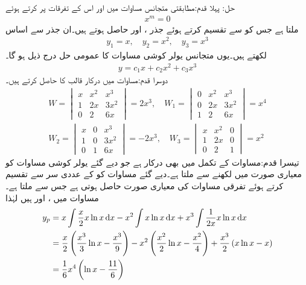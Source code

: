 حل: پہلا قدم:\quad مطابقتی متجانس مساوات میں  اور اس کے تفرقات  پر کرتے ہوئے
\begin{align*}
[m(m-1)(m-1)-3m(m-1)+6m-6]x^m=0
\end{align*}
ملتا ہے جس کو  سے تقسیم کرتے ہوئے  جذر ،  اور  حاصل ہوتے ہیں۔ان جذر سے اساس
\begin{align*}
y_1=x, \quad y_2=x^2,\quad y_3=x^3
\end{align*}
لکھتے ہیں۔یوں متجانس یولر کوشی مساوات کا عمومی حل درج ذیل ہو گا۔
\begin{align*}
y=c_1x+c_2x^2+c_3x^3
\end{align*}
دوسرا قدم:\quad مساوات  میں درکار قالب کا  حاصل کرتے ہیں۔
\begin{align*}
W=
\begin{vmatrix}
x & x^2 & x^3\\
1 & 2x & 3x^2\\
0 & 2 &  6x
\end{vmatrix}=2x^3, \quad
W_1=
\begin{vmatrix}
0 & x^2 & x^3\\
0 & 2x & 3x^2\\
1 & 2 &  6x
\end{vmatrix}=x^4\\
W_2=
\begin{vmatrix}
x & 0 & x^3\\
1 & 0 & 3x^2\\
0 & 1 &  6x
\end{vmatrix}=-2x^3, \quad
W_3=
\begin{vmatrix}
x & x^2 &0\\
1 & 2x & 0\\
0 & 2 &  1
\end{vmatrix}=x^2
\end{align*}
تیسرا قدم:\quad مساوات  کے تکمل میں  بھی درکار ہے جو دیے گئے یولر کوشی مساوات کو معیاری صورت میں لکھنے سے ملتا ہے۔دیے گئے مساوات کو  کے عددی سر   سے تقسیم کرتے ہوئے تفرقی مساوات کی معیاری صورت حاصل ہوتی ہے جس سے  ملتا ہے۔مساوات   میں ،  اور
  ہیں لہٰذا 
\begin{align*}
y_p&=x\int \frac{x}{2} x\ln x \dif x-x^2\int x\ln x \dif x+x^3\int \frac{1}{2x} x\ln x \dif x\\
&=\frac{x}{2}\left(\frac{x^3}{3}\ln x -\frac{x^3}{9}\right)-x^2\left(\frac{x^2}{2}\ln x-\frac{x^2}{4}\right)+\frac{x^3}{2}\left(x\ln x-x\right)\\
&=\frac{1}{6}x^4\left(\ln x-\frac{11}{6}\right)
\end{align*}
